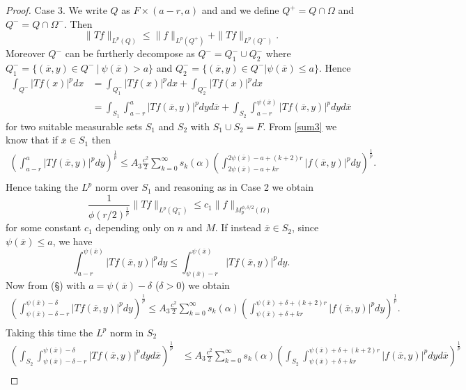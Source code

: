 \documentclass[12pt]{article}
\theoremstyle{definition}
\begin{document}
\begin{proof}
Case 3. We write $Q$ as $F \times (a-r,a)$ and and we define $Q^+=Q\cap\Omega$ and $Q^-=Q\cap\Omega^-.$ Then 
\[\|Tf\|_{L^p(Q)}\le\|f\|_{L^p(Q^+)}+\|Tf\|_{L^p(Q^-)}.\]
Moreover $Q^-$ can be furtherly decompose as $Q^-=Q^-_1 \cup Q^-_2$ where $Q^-_1=\{ (\overline x,y) \in Q^- \ | \ \psi(\overline x)>a \}$ and $Q^-_2=\{ (\overline x,y) \in Q^- | \psi(\overline x)\le a \}$. Hence
\begin{align*} \int_{Q^-} |Tf(x)|^pdx &= \int_{Q^-_1} |Tf(x)|^pdx +\int_{Q^-_2} |Tf(x)|^pdx\\
&=\int_{S_1} \int_{a-r}^{a} |Tf(\overline x,y)|^pdy d\overline x+\int_{S_2} \int_{a-r}^{\psi(\overline x)} |Tf(\overline x,y)|^pdy d\overline x
\end{align*}
for two suitable measurable sets $S_1$ and $S_2$ with $S_1 \cup S_2 = F.$ From \eqref{sum3} we know that if $\overline x \in S_1$ then
\begin{align*}
 \left(\int_{a-r}^{a}|Tf(\overline x,y)|^p dy\right)^{\frac{1}{p}} \le A_3\frac{c^2}{2} \sum_{k=0}^\infty s_k(\alpha) \left ( \int_{2\psi(\overline x) -a +kr}^{2\psi(\overline x) -a +(k+2)r}|f(\overline x, y)|^p  dy \right) ^{\frac{1}{p}}. \\
\end{align*}
Hence taking the $L^p$ norm over $S_1$ and reasoning as in Case 2 we obtain
\begin{equation}
\frac{1}{\phi(r/2)^{\frac{1}{p}}} \| Tf\|_{L^p(Q^-_1)} \le c_1 \| f\|_{M_p^{\phi,\delta/2}(\Omega)} \label{q1}
\end{equation}
for some constant $c_1$ depending only on $n$ and $M$. If instead $\overline x \in S_2$, since $\psi(\overline x)\le a$, we have
\begin{equation}
\int_{a-r}^{\psi(\overline x)} |Tf(\overline x,y)|^pdy \le \int_{\psi(\overline x)-r}^{\psi(\overline x)} |Tf(\overline x,y)|^pdy. \label{psia}
\end{equation}
Now from (§) with $a=\psi(\overline x)-\delta$ ($\delta>0$) we obtain
\begin{align*}
 \left(\int_{\psi(\overline x)-\delta-r}^{\psi(\overline x)-\delta}|Tf(\overline x,y)|^p dy\right)^{\frac{1}{p}} \le A_3\frac{c^2}{2} \sum_{k=0}^\infty s_k(\alpha) \left ( \int_{\psi(\overline x) +\delta +kr}^{\psi(\overline x) +\delta +(k+2)r}|f(\overline x, y)|^p  dy \right) ^{\frac{1}{p}}. \\
\end{align*}
Taking this time the $L^p$ norm in $S_2$ 
\begin{align*}
\left(\int_{S_2}\int_{\psi(\overline x)-\delta-r}^{\psi(\overline x)-\delta}|Tf(\overline x,y)|^p dy d\overline x\right)^{\frac{1}{p}} &\le A_3 \frac{c^2}{2} \sum_{k=0}^\infty s_k(\alpha) \left (\int_{S_2} \int_{\psi(\overline x) +\delta +kr}^{\psi(\overline x) +\delta +(k+2)r}|f(\overline x, y)|^p  dy d\overline x\right) ^{\frac{1}{p}}\\

\end{align*}
\end{proof}
\end{document}
